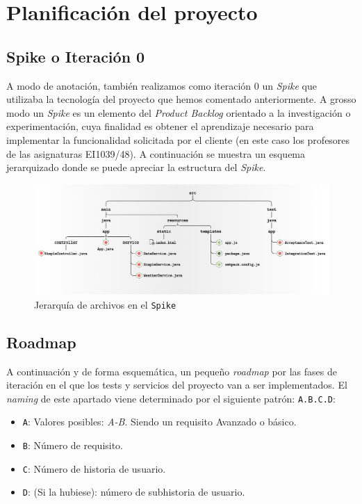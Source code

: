 \documentclass[../ei103948-project-documentation.tex]{subfiles}
\begin{document}
\section{Planificación del proyecto}
    \subsection{Spike o Iteración 0}

    A modo de anotación, también realizamos como iteración 0 un \textit{Spike} que utilizaba la tecnología del proyecto que hemos comentado anteriormente. A grosso modo un \textit{Spike} es un elemento del \textit{Product Backlog} orientado a la investigación o experimentación, cuya finalidad es obtener el aprendizaje necesario para implementar la funcionalidad solicitada por el cliente (en este caso los profesores de las asignaturas EI1039/48). A continuación se muestra un esquema jerarquizado donde se puede apreciar la estructura del \textit{Spike}. 

    \begin{figure}[H]
        \begin{center}
        \includegraphics[scale=0.105]{images/jerarquiaSpike.png}
        \end{center}
        \caption{Jerarquía de archivos en el \texttt{Spike}}
    \end{figure}
    \subsection{Roadmap}

        A continuación y de forma esquemática, un pequeño \textit{roadmap} por las fases de iteración en el que los tests y servicios del proyecto van a ser implementados. El \textit{naming} de este apartado viene determinado por el siguiente patrón: \texttt{A.B.C.D}:
            \begin{itemize}
                \item \texttt{A}: Valores posibles: \emph{A-B}. Siendo un requisito Avanzado o básico.
                \item \texttt{B}: Número de requisito.
                \item \texttt{C}: Número de historia de usuario.
                \item \texttt{D}: (Si la hubiese): número de subhistoria de usuario.
            \end{itemize}
\end{document}
